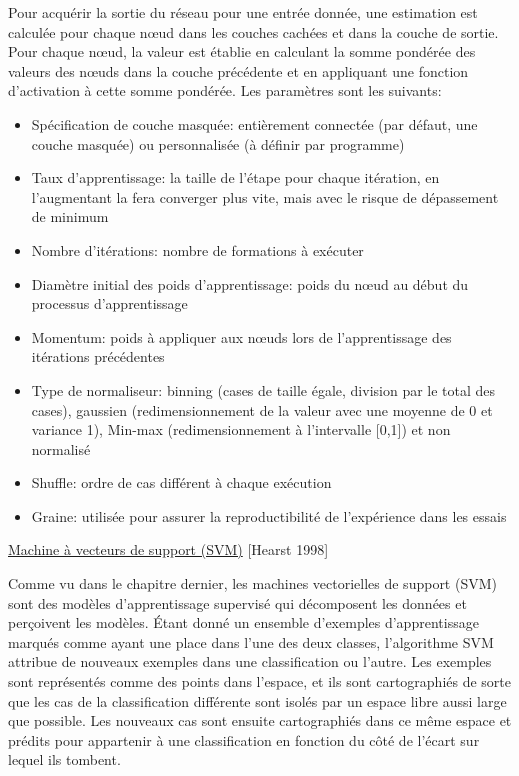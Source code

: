 \documentclass[12pt]{article}
\begin{document}
{Pour acquérir la sortie du réseau pour une entrée donnée, une estimation est calculée pour chaque nœud dans les couches cachées et dans la couche de sortie. Pour chaque nœud, la valeur est établie en calculant la somme pondérée des valeurs des nœuds dans la couche précédente et en appliquant une fonction d'activation à cette somme pondérée.
Les paramètres sont les suivants:
\begin{itemize}
\item Spécification de couche masquée: entièrement connectée (par défaut, une couche masquée) ou personnalisée (à définir par programme)
\item Taux d'apprentissage: la taille de l'étape pour chaque itération, en l'augmentant la fera converger plus vite, mais avec le risque de dépassement de minimum
\item Nombre d'itérations: nombre de formations à exécuter
\item Diamètre initial des poids d'apprentissage: poids du nœud au début du processus d'apprentissage
\item Momentum: poids à appliquer aux nœuds lors de l'apprentissage des itérations précédentes
\item Type de normaliseur: binning (cases de taille égale, division par le total des cases), gaussien (redimensionnement de la valeur avec une moyenne de 0 et variance 1), Min-max (redimensionnement à l'intervalle [0,1]) et non normalisé
\item Shuffle: ordre de cas différent à chaque exécution
\item Graine: utilisée pour assurer la reproductibilité de l'expérience dans les essais
\end{itemize}

\underline{Machine à vecteurs de support (SVM)} {\color{red}[Hearst 1998]}


Comme vu dans le chapitre dernier, les machines vectorielles de support (SVM) sont des modèles d'apprentissage supervisé qui décomposent les données et perçoivent les modèles.
Étant donné un ensemble d'exemples d'apprentissage marqués comme ayant une place dans l'une des deux classes, l'algorithme SVM attribue de nouveaux exemples dans une classification ou l'autre. Les exemples sont représentés comme des points dans l'espace, et ils sont cartographiés de sorte que les cas de la classification différente sont isolés par un espace libre aussi large que possible. Les nouveaux cas sont ensuite cartographiés dans ce même espace et prédits pour appartenir à une classification en fonction du côté de l'écart sur lequel ils tombent.

}
\end{document}

